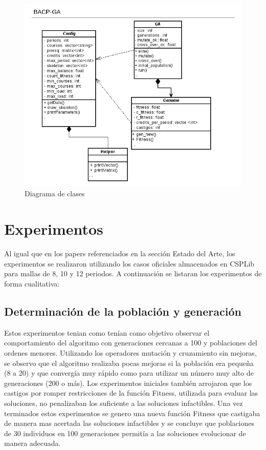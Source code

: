 \documentclass[letter, 10pt]{article}
\begin{document}
\begin{figure}[h]
  \centering
  \includegraphics[width=\textwidth]{ga}
  \caption{Diagrama de clases}
\end{figure}

\section{Experimentos}
\label{experimentos}
Al igual que en los papers referenciados en la sección Estado del Arte, los
experimentos se realizaron utilizando los casos oficiales almacenados en CSPLib
para mallas de 8, 10 y 12 periodos. A continuación se listaran los experimentos
de forma cualitativa:

\subsection{Determinación de la población y generación}
Estos experimentos tenian como tenían como objetivo observar el comportamiento
del algoritmo con generaciones cercanas a 100 y poblaciones del ordenes menores.
Utilizando los operadores mutación y cruzamiento sin mejoras, se observo que el
algoritmo realizaba pocas mejoras si la población era pequeña (8 a 20) y que
convergía muy rápido como para utilizar un número muy alto de generaciones (200
o más). Los experimentos iniciales también arrojaron que los castigos por romper
restricciones de la función Fitness, utilizada para evaluar las soluciones, no
penalizaban los suficiente a las soluciones infactibles. Una vez terminados
estos experimentos se genero una nueva función Fitness que castigaba de manera
mas acertada las soluciones infactibles y se concluye que poblaciones de 30 individuos en
100 generaciones permitía a las soluciones evolucionar de manera adecuada.
\end{document}
